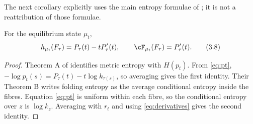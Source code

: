 The next corollary explicitly uses the main entropy formulae of
\citet{MartinsMattosVarao2026}; it is not a reattribution of those formulae.

\begin{corollary}\label{cor:folding}
For the equilibrium state $\mu_t$,
\[
 h_{\mu_t}(F_\tau)=P_\tau(t)-tP_\tau'(t),
 \qquad
 \cF_{\mu_t}(F_\tau)=P_\tau'(t).
 \tag{3.8}\label{eq:entropy-bridge}
\]
\end{corollary}

\begin{proof}
Theorem A of \citet{MartinsMattosVarao2026} identifies metric entropy with
$H(p_t)$.  From \eqref{eq:pt},
$-\log p_t(s)=P_\tau(t)-t\log k_{\tau(s)}$, so averaging gives the first
identity.  Their Theorem B writes folding entropy as the average conditional
entropy inside the fibres.  Equation \eqref{eq:pt} is uniform within each
fibre, so the conditional entropy over $z$ is $\log k_z$.  Averaging with
$r_t$ and using \eqref{eq:derivatives} gives the second identity.
\end{proof}
